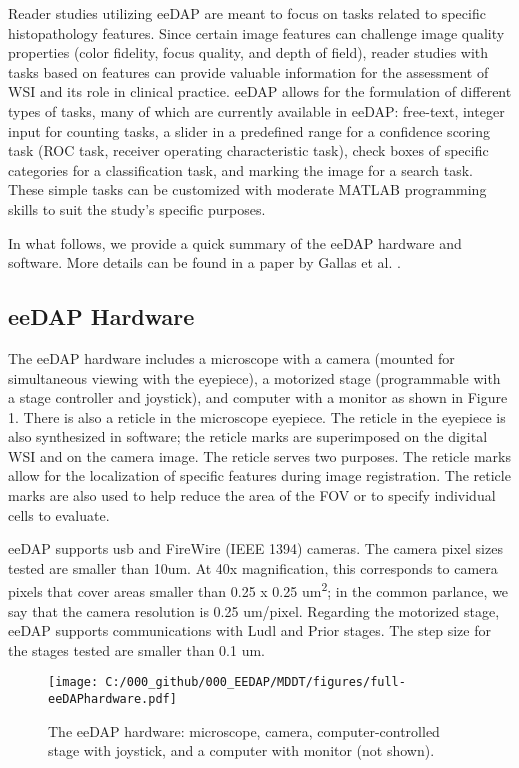 \documentclass{article}%
\begin{document}
Reader studies utilizing eeDAP are meant to focus on tasks related to specific
histopathology features. Since certain image features can challenge image
quality properties (color fidelity, focus quality, and depth of field), reader
studies with tasks based on features can provide valuable information for the
assessment of WSI and its role in clinical practice. eeDAP allows for the
formulation of different types of tasks, many of which are currently available
in eeDAP: free-text, integer input for counting tasks, a slider in a
predefined range for a confidence scoring task (ROC task, receiver operating
characteristic task), check boxes of specific categories for a classification
task, and marking the image for a search task. These simple tasks can be
customized with moderate MATLAB programming skills to suit the study's
specific purposes.

In what follows, we provide a quick summary of the eeDAP hardware and
software. More details can be found in a paper by Gallas et al.
\cite{Gallas2014_J-Med-Img_v1p037501}.

\subsection{eeDAP Hardware}

\label{eedap-hardware}

The eeDAP hardware includes a microscope with a camera (mounted for
simultaneous viewing with the eyepiece), a motorized stage (programmable with
a stage controller and joystick), and computer with a monitor as shown in
Figure 1. There is also a reticle in the microscope eyepiece. The reticle in
the eyepiece is also synthesized in software; the reticle marks are
superimposed on the digital WSI and on the camera image. The reticle serves
two purposes. The reticle marks allow for the localization of specific
features during image registration. The reticle marks are also used to help
reduce the area of the FOV or to specify individual cells to evaluate.

eeDAP supports usb and FireWire (IEEE 1394) cameras. The camera pixel sizes
tested are smaller than 10um. At 40x magnification, this corresponds to camera
pixels that cover areas smaller than 0.25 x 0.25 um\textsuperscript{2}; in the
common parlance, we say that the camera resolution is 0.25 um/pixel. Regarding
the motorized stage, eeDAP supports communications with Ludl and Prior stages.
The step size for the stages tested are smaller than 0.1 um.

\begin{figure}[ptbh]
\label{fig_full-eeDAPhardware}
\texttt{[image: C:/000\_github/000\_EEDAP/MDDT/figures/full-eeDAPhardware.pdf]}\caption{The
eeDAP hardware: microscope, camera, computer-controlled stage with joystick,
and a computer with monitor (not shown).}%
\end{figure}
\end{document}

